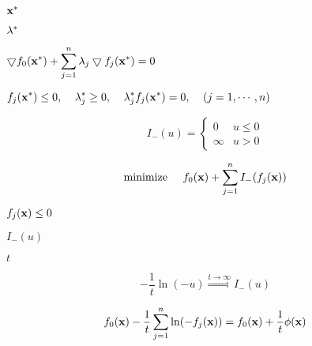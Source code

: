 {\newpage\clearpage
{}%
${\bf x}^*$%
\lthtmlinlinemathZ
\lthtmlcheckvsize\clearpage}

{\newpage\clearpage
{}%
${\bf\lambda}^*$%
\lthtmlinlinemathZ
\lthtmlcheckvsize\clearpage}

{\newpage\clearpage
{}%
$\displaystyle \bigtriangledown f_0({\bf x}^*)+\sum_{j=1}^n\lambda_j\bigtriangledown f_j({\bf x}^*)=0$%
\lthtmlindisplaymathZ
\lthtmlcheckvsize\clearpage}

{\newpage\clearpage
{}%
$\displaystyle f_j({\bf x}^*)\le 0,\;\;\;\;\lambda^*_j\ge 0,\;\;\;\;
  \lambda^*_j f_j({\bf x}^*)=0,\;\;\;\;(j=1,\cdots,n)$%
\lthtmlindisplaymathZ
\lthtmlcheckvsize\clearpage}

{\newpage\clearpage
{}%
\begin{displaymath}
I_-(u)=\left\{\begin{array}{ll}0 & u\le 0\\\infty& u>0\end{array}
\right.
\end{displaymath}%
\lthtmldisplayZ
\lthtmlcheckvsize\clearpage}

{\newpage\clearpage
{}%
\begin{displaymath}
  \mbox{minimize} \;\;\;\;\; f_0({\bf x})+\sum_{j=1}^nI_-(f_j({\bf x}))
\end{displaymath}%
\lthtmldisplayZ
\lthtmlcheckvsize\clearpage}

{\newpage\clearpage
{}%
$f_j({\bf x})\le 0$%
\lthtmlinlinemathZ
\lthtmlcheckvsize\clearpage}

{\newpage\clearpage
{}%
$I_-(u)$%
\lthtmlinlinemathZ
\lthtmlcheckvsize\clearpage}

{\newpage\clearpage
{}%
$t$%
\lthtmlinlinemathZ
\lthtmlcheckvsize\clearpage}

{\newpage\clearpage
{}%
\begin{displaymath}
-\frac{1}{t}\ln(-u)\stackrel{t\rightarrow \infty}{\Longrightarrow}I_-(u)
\end{displaymath}%
\lthtmldisplayZ
\lthtmlcheckvsize\clearpage}

{\newpage\clearpage
{}%
\begin{displaymath}
f_0({\bf x})-\frac{1}{t}\sum_{j=1}^n \ln(-f_j({\bf x}))
=f_0({\bf x})+\frac{1}{t}\phi({\bf x})
\end{displaymath}%
\lthtmldisplayZ
\lthtmlcheckvsize\clearpage}

